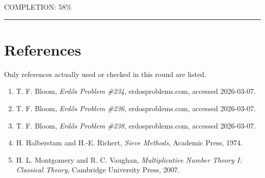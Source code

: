 COMPLETION: 58\%

\bigskip
\hrule
\bigskip

\section*{References}

Only references actually used or checked in this round are listed.

\begin{enumerate}
\item T. F. Bloom, \emph{Erd\H{o}s Problem \#234}, erdosproblems.com, accessed 2026-03-07.
\item T. F. Bloom, \emph{Erd\H{o}s Problem \#236}, erdosproblems.com, accessed 2026-03-07.
\item T. F. Bloom, \emph{Erd\H{o}s Problem \#238}, erdosproblems.com, accessed 2026-03-07.
\item H. Halberstam and H.-E. Richert, \emph{Sieve Methods}, Academic Press, 1974.
\item H. L. Montgomery and R. C. Vaughan, \emph{Multiplicative Number Theory I: Classical Theory}, Cambridge University Press, 2007.
\end{enumerate}
